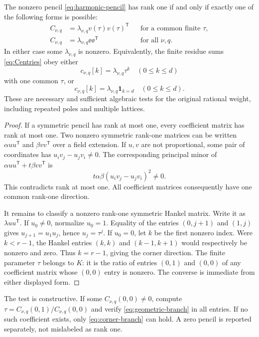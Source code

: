 \begin{theorem}\label{thm:classification}
The nonzero pencil \eqref{eq:harmonic-pencil} has rank one if and only
if exactly one of the following forms is possible:
\begin{align}
 C_{\nu,q}&=\lambda_{\nu,q}v(\tau)v(\tau)^{\mathsf T}
       &&\text{for a common finite }\tau,\label{eq:geometric-branch}\\
 C_{\nu,q}&=\lambda_{\nu,q}\ee\ee^{\mathsf T}
       &&\text{for all }\nu,q.\label{eq:corner-branch}
\end{align}
In either case some $\lambda_{\nu,q}$ is nonzero. Equivalently, the
finite residue sums \eqref{eq:Centries} obey either
\[
 c_{\nu,q}[k]=\lambda_{\nu,q}\tau^k\quad(0\le k\le d)
\]
with one common $\tau$, or
\[
 c_{\nu,q}[k]=\lambda_{\nu,q}\mathbf1_{k=d}\quad(0\le k\le d).
\]
These are necessary and sufficient algebraic tests for the original
rational weight, including repeated poles and multiple lattices.
\end{theorem}
\begin{proof}
If a symmetric pencil has rank at most one, every coefficient matrix
has rank at most one. Two nonzero symmetric rank-one matrices can be
written $\alpha uu^{\mathsf T}$ and $\beta vv^{\mathsf T}$ over a
field extension. If $u,v$ are not proportional, some pair of coordinates
has $u_iv_j-u_jv_i\ne0$. The corresponding principal minor of
$\alpha uu^{\mathsf T}+t\beta vv^{\mathsf T}$ is
\[
 t\alpha\beta(u_iv_j-u_jv_i)^2\ne0.
\]
This contradicts rank at most one. All coefficient matrices consequently
have one common rank-one direction.

It remains to classify a nonzero rank-one symmetric Hankel matrix.
Write it as $\lambda uu^{\mathsf T}$. If $u_0\ne0$, normalize
$u_0=1$. Equality of the entries $(0,j+1)$ and $(1,j)$ gives
$u_{j+1}=u_1u_j$, hence $u_j=\tau^j$. If $u_0=0$, let $k$ be
the first nonzero index. Were $k<r-1$, the Hankel entries $(k,k)$
and $(k-1,k+1)$ would respectively be nonzero and zero. Thus
$k=r-1$, giving the corner direction. The finite parameter $\tau$
belongs to $K$: it is the ratio of entries $(0,1)$ and $(0,0)$ of
any coefficient matrix whose $(0,0)$ entry is nonzero. The converse
is immediate from either displayed form.
\end{proof}

The test is constructive. If some $C_{\nu,q}(0,0)\ne0$, compute
$\tau=C_{\nu,q}(0,1)/C_{\nu,q}(0,0)$ and verify
\eqref{eq:geometric-branch} in all entries. If no such coefficient
exists, only \eqref{eq:corner-branch} can hold. A zero pencil is
reported separately, not mislabeled as rank one.

